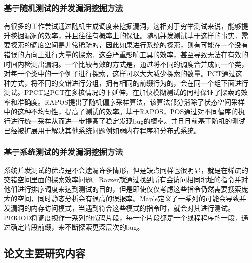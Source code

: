 \subsubsection{基于随机测试的并发漏洞挖掘方法}

有很多的工作尝试通过随机生成调度来挖掘漏洞，这相对于穷举测试来说，能够提升挖掘漏洞的效率，并且往往有概率上的保证。随机并发测试基于这样的事实，需要探索的调度空间是非常稀疏的，因此如果进行系统的探索，则有可能在一个没有错误的方向上进行大量的探索，这会严重影响工具的效率，甚至导致无法在有效的时间内检测出漏洞。一个比较有效的方式是，通过将不同的调度合并成同一个类，对每一个类中的一个例子进行探索，这样可以大大减少探索的数量。PCT\cite{burckhardt2010randomized}通过这种方式，将不同的交错进行分组，拥有相同的前缀行为的，会在同一个组下面进行测试。PPCT\cite{nagarakatte2012multicore}是PCT在多核情况的下延伸，在加快模糊测试的同时保证了探索的效率和准确度。RAPOS\cite{sen2007effective}提出了随机偏序采样算法，该算法部分消除了状态空间采样中的这种不均匀性，提高了测试的效率。基于RAPOS，POS\cite{yuan2018partial}通过对不同偏序的执行进行统一采样从而进一步提高了稳定发现bug的概率。并且目前基于随机的测试已经被扩展用于解决其他系统问题例如弱内存程序\cite{gao2023probabilistic, luo2021c11tester}和分布式系统\cite{ozkan2018randomized, ozkan2019trace, yuan2020effective}。

\subsubsection{基于系统测试的并发漏洞挖掘方法}

系统并发测试的优点是不会遗漏许多情形，但是缺点同样也很明显，就是在稀疏的交错空间里面的探索效率问题。Razzer就通过找到所有会访问相同地址的指令并对他们进行排序调度来达到测试的目的，但是即使仅仅考虑这些指令仍然需要搜索庞大的空间，同时静态分析会有很高的误报率。Maple\cite{yu2012maple}定义了一系列的可能会导致并发漏洞的内存访问模式，当遇到符合这些模式的指令时，就会对其进行测试。PERIOD\cite{wen2022controlled}将调度视作一系列的代码片段，每一个片段都是一个线程程序的一段，通过确定片段前缀，来不断探索更深层次的bug。


\subsection{论文主要研究内容}


